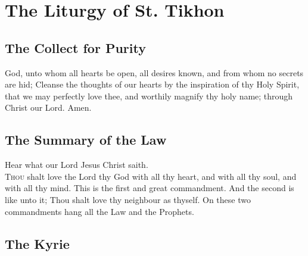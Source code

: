 \section{The Liturgy of St. Tikhon}
\subsection{The Collect for Purity}
 God, unto whom all hearts be open, all desires known, and from whom no secrets are hid; Cleanse the thoughts of our hearts by the inspiration of thy Holy Spirit, that we may perfectly love thee, and worthily magnify thy holy name; through Christ our Lord. Amen.
\subsection{The Summary of the Law}
%
\noindent%
Hear what our Lord Jesus Christ saith.\\
\textsc{Thou} shalt love the Lord thy God with all thy heart, and with all thy soul, and with all thy mind. This is the first and great commandment. And the second is like unto it; Thou shalt love thy neighbour as thyself. On these two commandments hang all the Law and the Prophets.
\subsection{The Kyrie}
